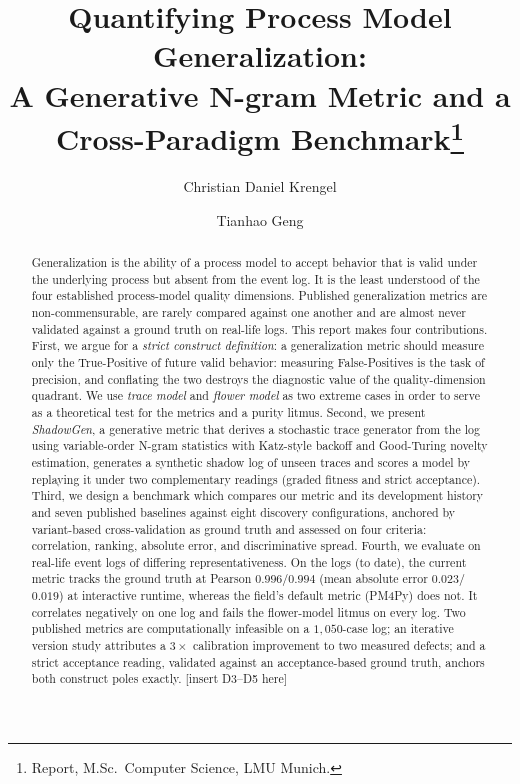 \documentclass[runningheads]{llncs}
\begin{document}
\title{Quantifying Process Model Generalization:\\
A Generative N-gram Metric and a Cross-Paradigm Benchmark\thanks{Report, M.Sc.\ Computer Science, LMU Munich.}}

\author{Christian Daniel Krengel \and Tianhao Geng}

\maketitle

\begin{abstract}
Generalization is the ability of a process model to accept behavior that is valid under the underlying process but absent from the event log. It is the least understood of the four established process-model quality dimensions. Published generalization metrics are non-commensurable, are rarely compared against one another and are almost never validated against a ground truth on real-life logs. This report makes four contributions. First, we argue for a \emph{strict construct definition}: a generalization metric should measure only the True-Positive of future valid behavior: measuring False-Positives is the task of precision, and conflating the two destroys the diagnostic value of the quality-dimension quadrant. We use \emph{trace model} and \emph{flower model} as two extreme cases in order to serve as a theoretical test for the metrics and a purity litmus. Second, we present \emph{ShadowGen}, a generative metric that derives a stochastic trace generator from the log using variable-order N-gram statistics with Katz-style backoff and Good-Turing novelty estimation, generates a synthetic shadow log of unseen traces and scores a model by replaying it under two complementary readings (graded fitness and strict acceptance). Third, we design a benchmark which compares our metric and its development history and seven published baselines against eight discovery configurations, anchored by variant-based cross-validation as ground truth and assessed on four criteria: correlation, ranking, absolute error, and discriminative spread. Fourth, we evaluate on real-life event logs of differing representativeness. On the logs (to date), the current metric tracks the ground truth at Pearson $0.996$/$0.994$ (mean absolute error $0.023$/$0.019$) at interactive runtime, whereas the field's default metric (PM4Py) does not. It correlates negatively on one log and fails the flower-model litmus on every log. Two published metrics are computationally infeasible on a $1{,}050$-case log; an iterative version study attributes a $3\times$ calibration improvement to two measured defects; and a strict acceptance reading, validated against an acceptance-based ground truth, anchors both construct poles exactly. [insert D3--D5 here]

\end{abstract}
\end{document}
